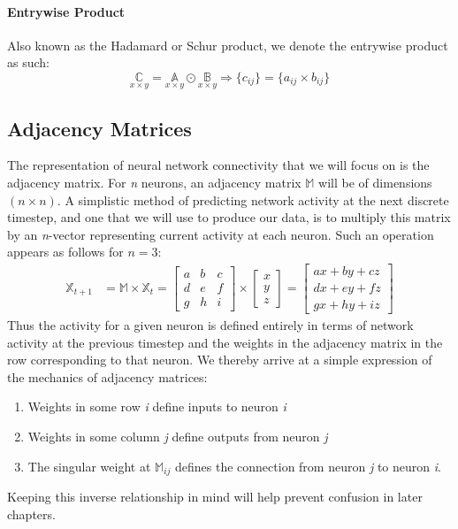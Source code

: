\paragraph{Entrywise Product}
Also known as the Hadamard or Schur product, we denote the entrywise product as 
such:
\begin{equation}
	\underset{x \times y}{\mathbb{C}} = \underset{x \times y}{\mathbb{A}} \odot 
	\underset{x \times y}{\mathbb{B}} \Rightarrow \{c_{ij}\} = \{a_{ij} \times 
	b_{ij}\}
	\end{equation}

\subsection{Adjacency Matrices}
\label{subsec:adjacency}
The representation of neural network connectivity that we will focus on is the 
adjacency matrix. For \textit{n} neurons, an adjacency matrix $\mathbb{M}$ will 
be of dimensions $(n \times n)$. A simplistic method of predicting network 
activity at the next discrete timestep, and one that we will use to produce our 
data, is to multiply this matrix by an \textit{n}-vector representing current 
activity at each neuron.  Such an operation appears as follows for $n=3$:
\begin{align}
	\mathbb{X}_{t+1} &= \mathbb{M}\times\mathbb{X}_t =
	\begin{bmatrix}
		a & b & c\\
		d & e & f\\
		g & h & i
	\end{bmatrix}
	\times
	\begin{bmatrix}
		x\\
		y\\
		z
	\end{bmatrix}
	=
	\begin{bmatrix}
		ax + by + cz\\
		dx + ey + fz\\
		gx + hy + iz
	\end{bmatrix}
\end{align}
Thus the activity for a given neuron is defined entirely in terms of network 
activity at the previous timestep and the weights in the adjacency matrix in the 
row corresponding to that neuron. We thereby arrive at a simple expression of 
the mechanics of adjacency matrices: 

\begin{enumerate}
	\item Weights in some row \textit{i} define inputs to neuron \textit{i}
	\item Weights in some column \textit{j} define outputs from neuron 
		\textit{j}
	\item The singular weight at $\mathbb{M}_{ij}$ defines the connection from 
		neuron \textit{j} to neuron \textit{i}.  
\end{enumerate}

Keeping this inverse relationship in mind will help prevent confusion in later 
chapters.
